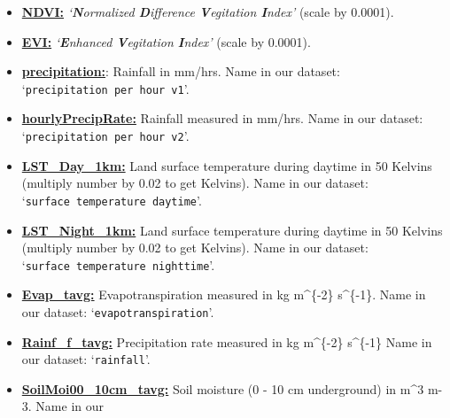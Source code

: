 \documentclass[10pt,parskip=half,
toc=sectionentrywithdots,
bibliography=totocnumbered,
captions=tableheading,numbers=noendperiod]{scrartcl}
\providecommand{\tightlist}{%
  \setlength{\itemsep}{0pt}\setlength{\parskip}{0pt}}
\begin{document}
\begin{itemize}
\tightlist
\item
  \href{https://developers.google.com/earth-engine/datasets/catalog/MODIS_006_MOD13A2}{\textbf{NDVI:}}
  \emph{`\textbf{\emph{N}}ormalized \textbf{\emph{D}}ifference
  \textbf{\emph{V}}egitation \textbf{\emph{I}}ndex'} (scale by
  0.0001).\\
\item
  \href{https://developers.google.com/earth-engine/datasets/catalog/MODIS_006_MOD13A2}{\textbf{EVI:}}
  \emph{`\textbf{\emph{E}}nhanced \textbf{\emph{V}}egitation
  \textbf{\emph{I}}ndex'} (scale by 0.0001).
\item
  \href{https://developers.google.com/earth-engine/datasets/catalog/TRMM_3B43V7\#bands}{\textbf{precipitation:}}:
  Rainfall in mm/hrs. Name in our dataset:
  `\texttt{precipitation\ per\ hour\ v1}'.
\item
  \href{https://developers.google.com/earth-engine/datasets/catalog/JAXA_GPM_L3_GSMaP_v6_operational}{\textbf{hourlyPrecipRate:}}
  Rainfall measured in mm/hrs. Name in our dataset:
  `\texttt{precipitation\ per\ hour\ v2}'.
\item
  \href{https://developers.google.com/earth-engine/datasets/catalog/MODIS_006_MOD11A1}{\textbf{LST\_Day\_1km:}}
  Land surface temperature during daytime in 50 Kelvins (multiply number
  by 0.02 to get Kelvins). Name in our dataset:
  `\texttt{surface\ temperature\ daytime}'.
\item
  \href{https://developers.google.com/earth-engine/datasets/catalog/MODIS_006_MOD11A1}{\textbf{LST\_Night\_1km:}}
  Land surface temperature during daytime in 50 Kelvins (multiply number
  by 0.02 to get Kelvins). Name in our dataset:
  `\texttt{surface\ temperature\ nighttime}'.
\item
  \href{https://developers.google.com/earth-engine/datasets/catalog/NASA_FLDAS_NOAH01_C_GL_M_V001}{\textbf{Evap\_tavg:}}
  Evapotranspiration measured in kg m\^{}\{-2\} s\^{}\{-1\}. Name in our
  dataset: `\texttt{evapotranspiration}'.
\item
  \href{https://developers.google.com/earth-engine/datasets/catalog/NASA_FLDAS_NOAH01_C_GL_M_V001}{\textbf{Rainf\_f\_tavg:}}
  Precipitation rate measured in kg m\^{}\{-2\} s\^{}\{-1\} Name in our
  dataset: `\texttt{rainfall}'.
\item
  \href{https://developers.google.com/earth-engine/datasets/catalog/NASA_FLDAS_NOAH01_C_GL_M_V001}{\textbf{SoilMoi00\_10cm\_tavg:}}
  Soil moisture (0 - 10 cm underground) in m\^{}3 m-3. Name in our

\end{itemize}
\end{document}
